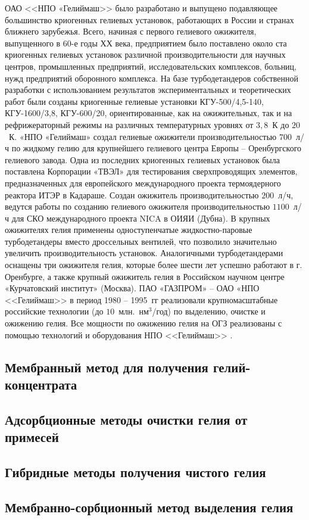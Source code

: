 ОАО <<НПО «Гелиймаш>> было разработано и выпущено подавляющее большинство криогенных гелиевых установок, работающих в России и странах ближнего зарубежья. Всего, начиная с первого гелиевого ожижителя, выпущенного в 60-е годы ХХ века, предприятием было поставлено около ста криогенных гелиевых установок различной производительности для научных центров, промышленных предприятий, исследовательских комплексов, больниц, нужд предприятий оборонного комплекса. На базе турбодетандеров собственной разработки с использованием результатов экспериментальных и теоретических работ были созданы криогенные гелиевые установки КГУ-500/4,5-140, КГУ-1600/3,8, КГУ-600/20, ориентированные, как на ожижительных, так и на рефрижераторный режимы на различных температурных уровнях от $3,8$~К до $20$~К. «НПО «Гелиймаш» создал гелиевые ожижители производительностью $700$~л/ч по жидкому гелию для крупнейшего гелиевого центра Европы -- Оренбургского гелиевого завода. Одна из последних криогенных гелиевых установок была поставлена  Корпорации «ТВЭЛ» для тестирования сверхпроводящих элементов, предназначенных для европейского международного проекта термоядерного реактора ИТЭР в Кадараше. Создан ожижитель производительностью $200$~л/ч, ведутся работы по созданию гелиевого ожижителя производительностью $1100$~л/ч для СКО международного проекта NICA в ОИЯИ (Дубна). В крупных ожижителях гелия применены одноступенчатые жидкостно-паровые турбодетандеры вместо дроссельных вентилей, что позволило значительно увеличить производительность установок. Аналогичными турбодетандерами оснащены три ожижителя гелия, которые более шести лет успешно работают в г. Оренбурге, а также крупный ожижитель гелия в Российском научном центре «Курчатовский институт» (Москва). ПАО «ГАЗПРОМ» -- ОАО «НПО <<Гелиймаш>> в период 1980 -- 1995~гг реализовали крупномасштабные российские технологии (до $10$~млн.~нм$^3$/год) по выделению, очистке и ожижению гелия. Все мощности по ожижению гелия на ОГЗ реализованы с помощью технологий и оборудования НПО <<Гелиймаш>> \cite{GeliyMash_OG-1000}.


\cite{Stepanov_Avtoreferat}

\subsection{Мембранный метод для получения гелий-концентрата} \label{section_1_1_2}

\subsection{Адсорбционные методы очистки гелия от примесей} \label{section_1_1_3}

\subsection{Гибридные методы получения чистого гелия} \label{section_1_1_4}

\subsection{Мембранно-сорбционный метод выделения гелия} \label{section_1_1_5}
